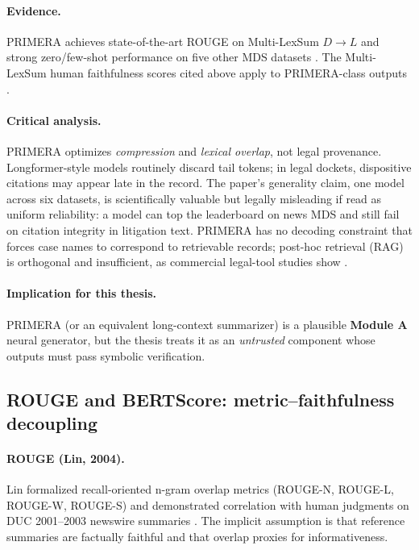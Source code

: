 \paragraph{Evidence.}
PRIMERA achieves state-of-the-art ROUGE on Multi-LexSum $D \rightarrow L$ and strong zero/few-shot performance on five other MDS datasets \cite{xiao2022primera}. The Multi-LexSum human faithfulness scores cited above apply to PRIMERA-class outputs \cite{shen2022multilexsum}.

\paragraph{Critical analysis.}
PRIMERA optimizes \emph{compression} and \emph{lexical overlap}, not legal provenance. Longformer-style models routinely discard tail tokens; in legal dockets, dispositive citations may appear late in the record. The paper's generality claim, one model across six datasets, is scientifically valuable but legally misleading if read as uniform reliability: a model can top the leaderboard on news MDS and still fail on citation integrity in litigation text. PRIMERA has no decoding constraint that forces case names to correspond to retrievable records; post-hoc retrieval (RAG) is orthogonal and insufficient, as commercial legal-tool studies show \cite{magesh2025hallucinationfree}.

\paragraph{Implication for this thesis.}
PRIMERA (or an equivalent long-context summarizer) is a plausible \textbf{Module A} neural generator, but the thesis treats it as an \emph{untrusted} component whose outputs must pass symbolic verification.

\subsection{ROUGE and BERTScore: metric--faithfulness decoupling}
\label{sec:lit-metrics}

\paragraph{ROUGE (Lin, 2004).}
Lin formalized recall-oriented n-gram overlap metrics (ROUGE-N, ROUGE-L, ROUGE-W, ROUGE-S) and demonstrated correlation with human judgments on DUC 2001--2003 newswire summaries \cite{lin2004rouge}. The implicit assumption is that reference summaries are factually faithful and that overlap proxies for informativeness.

